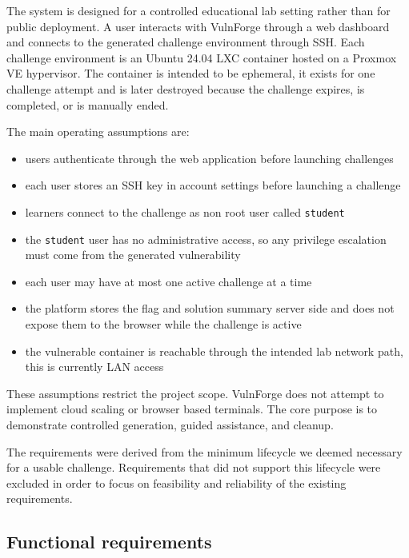 The system is designed for a controlled educational lab setting rather than for public deployment. A user interacts with VulnForge through a web dashboard and connects to the generated challenge environment through SSH. Each challenge environment is an Ubuntu 24.04 LXC container hosted on a Proxmox VE hypervisor. The container is intended to be ephemeral, it exists for one challenge attempt and is later destroyed because the challenge expires, is completed, or is manually ended.

The main operating assumptions are:
\begin{itemize}
	\item users authenticate through the web application before launching challenges
	\item each user stores an SSH key in account settings before launching a challenge
	\item learners connect to the challenge as non root user called \lstinline|student|
	\item the \lstinline|student| user has no administrative access, so any privilege escalation must come from the generated vulnerability
	\item each user may have at most one active challenge at a time
	\item the platform stores the flag and solution summary server side and does not expose them to the browser while the challenge is active
	\item the vulnerable container is reachable through the intended lab network path, this is currently LAN access
\end{itemize}

These assumptions restrict the project scope. VulnForge does not attempt to implement cloud scaling or browser based terminals. The core purpose is to demonstrate controlled generation, guided assistance, and cleanup.

The requirements were derived from the minimum lifecycle we deemed necessary for a usable challenge. Requirements that did not support this lifecycle were excluded in order to focus on feasibility and reliability of the existing requirements.

\subsection{Functional requirements}\label{sec:functional_requirements}

